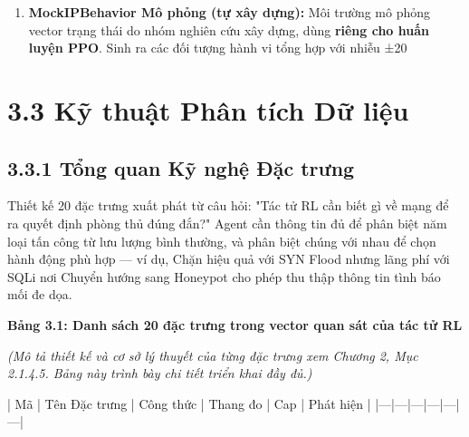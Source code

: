 \documentclass[12pt,a4paper,twoside]{report}
\begin{document}
{\begin{enumerate}
\item \textbf{MockIPBehavior Mô phỏng (tự xây dựng):} Môi trường mô phỏng vector trạng thái do nhóm nghiên cứu xây dựng, dùng \textbf{riêng cho huấn luyện PPO}. Sinh ra các đối tượng hành vi tổng hợp với nhiễu ±20%
\end{enumerate}


\section{3.3 Kỹ thuật Phân tích Dữ liệu}

\subsection{3.3.1 Tổng quan Kỹ nghệ Đặc trưng}

Thiết kế 20 đặc trưng xuất phát từ câu hỏi: "Tác tử RL cần biết gì về mạng để ra quyết định phòng thủ đúng đắn?" Agent cần thông tin đủ để phân biệt năm loại tấn công từ lưu lượng bình thường, và phân biệt chúng với nhau để chọn hành động phù hợp — ví dụ, Chặn hiệu quả với SYN Flood nhưng lãng phí với SQLi nơi Chuyển hướng sang Honeypot cho phép thu thập thông tin tình báo mối đe dọa.

\textbf{Bảng 3.1: Danh sách 20 đặc trưng trong vector quan sát của tác tử RL}

\textit{(Mô tả thiết kế và cơ sở lý thuyết của từng đặc trưng xem Chương 2, Mục 2.1.4.5. Bảng này trình bày chi tiết triển khai đầy đủ.)}

| Mã | Tên Đặc trưng | Công thức | Thang đo | Cap | Phát hiện |
|---|---|---|---|---|---|


}
\end{document}
